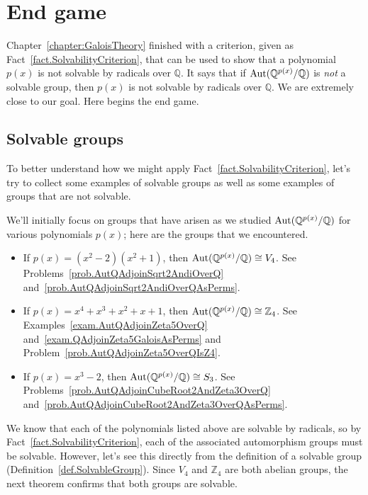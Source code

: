 \chapter{End game}
\label{chapter:EndGame}
\thispagestyle{empty}

Chapter~\ref{chapter:GaloisTheory} finished with a criterion, given as Fact~\ref{fact.SolvabilityCriterion}, that can be used to show that a polynomial $p(x)$ is not solvable by radicals over $\mathbb{Q}$.  It says that if $\operatorname{Aut}(\mathbb{Q}^{p(x)}/\mathbb{Q})$ is \emph{not} a solvable group, then $p(x)$ is not solvable by radicals over $\mathbb{Q}$. We are extremely close to our goal. Here begins the end game.


\section{Solvable groups}
To better understand how we might apply Fact~\ref{fact.SolvabilityCriterion}, let's try to collect some examples of solvable groups as well as some examples of groups that are not solvable. 

We'll initially focus on  groups that have arisen as we studied $\operatorname{Aut}(\mathbb{Q}^{p(x)}/\mathbb{Q})$ for various polynomials $p(x)$; here are the groups that we encountered.
\begin{itemize}
\item If $p(x) = (x^2-2)(x^2+1)$, then $\operatorname{Aut}(\mathbb{Q}^{p(x)}/\mathbb{Q})\cong V_4$. See Problems~\ref{prob.AutQAdjoinSqrt2AndiOverQ} and~\ref{prob.AutQAdjoinSqrt2AndiOverQAsPerms}.
\item If $p(x) = x^4+x^3+x^2+x+1$, then $\operatorname{Aut}(\mathbb{Q}^{p(x)}/\mathbb{Q})\cong \mathbb{Z}_4$. See Examples~\ref{exam.AutQAdjoinZeta5OverQ} and~\ref{exam.QAdjoinZeta5GaloisAsPerms} and Problem~\ref{prob.AutQAdjoinZeta5OverQIsZ4}.
\item If $p(x) = x^3-2$, then $\operatorname{Aut}(\mathbb{Q}^{p(x)}/\mathbb{Q})\cong S_3$. See Problems~\ref{prob.AutQAdjoinCubeRoot2AndZeta3OverQ} and~\ref{prob.AutQAdjoinCubeRoot2AndZeta3OverQAsPerms}.
\end{itemize}

We know that each of the polynomials listed above are solvable by radicals, so by Fact~\ref{fact.SolvabilityCriterion}, each of the associated automorphism groups must be solvable. However, let's see this directly from the definition of a solvable group (Definition~\ref{def.SolvableGroup}). Since $V_4$ and $\mathbb{Z}_4$ are both abelian groups, the next theorem confirms that both groups are solvable. 

